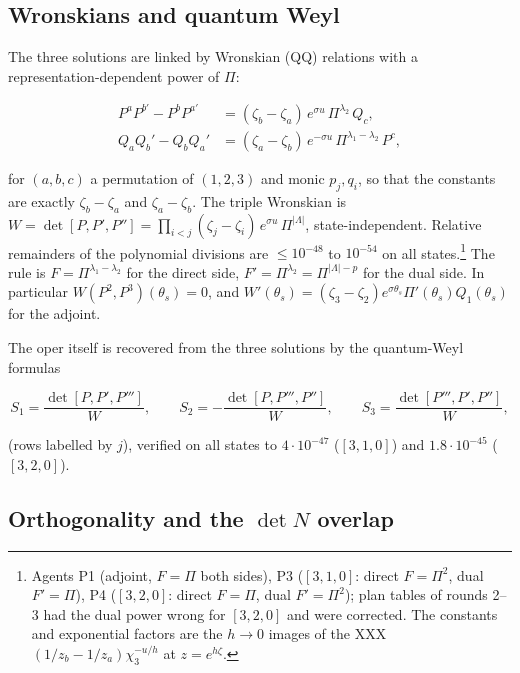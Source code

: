 \documentclass[11pt]{article}
\begin{document}
\subsection{Wronskians and quantum Weyl}\label{sec:wronsk}

The three solutions are linked by Wronskian (QQ) relations with a representation-dependent power of $\Pi$:

\begin{equation}
\begin{aligned}
P^aP^{b\prime}-P^bP^{a\prime}&=(\zeta_b-\zeta_a)\,e^{\sigma u}\,\Pi^{\lambda_2}\,Q_c,\\
Q_aQ_b'-Q_bQ_a'&=(\zeta_a-\zeta_b)\,e^{-\sigma u}\,\Pi^{\lambda_1-\lambda_2}\,P^c,
\end{aligned}\label{eq:QQ}
\end{equation}

for $(a,b,c)$ a permutation of $(1,2,3)$ and monic $p_j,q_i$, so that the constants are exactly $\zeta_b-\zeta_a$ and $\zeta_a-\zeta_b$. The triple Wronskian is $W=\det[P,P',P'']=\prod_{i<j}(\zeta_j-\zeta_i)\,e^{\sigma u}\,\Pi^{|\Lambda|}$, state-independent.
Relative remainders of the polynomial divisions are $\le10^{-48}$ to $10^{-54}$ on all states.\footnote{Agents P1 (adjoint, $F=\Pi$ both sides), P3 ($[3,1,0]$: direct $F=\Pi^2$, dual $F'=\Pi$), P4 ($[3,2,0]$: direct $F=\Pi$, dual $F'=\Pi^2$); plan tables of rounds 2--3 had the dual power wrong for $[3,2,0]$ and were corrected.
The constants and exponential factors are the $h\to0$ images of the XXX $(1/z_b-1/z_a)\chi_3^{-u/h}$ at $z=e^{h\zeta}$.} The rule is $F=\Pi^{\lambda_1-\lambda_2}$ for the direct side, $F'=\Pi^{\lambda_2}=\Pi^{|\Lambda|-p}$ for the dual side.
In particular $W(P^2,P^3)(\theta_s)=0$, and $W'(\theta_s)=(\zeta_3-\zeta_2)e^{\sigma\theta_s}\Pi'(\theta_s)Q_1(\theta_s)$ for the adjoint.

The oper itself is recovered from the three solutions by the quantum-Weyl formulas

\begin{equation}
S_1=\frac{\det[P,P',P''']}{W},\qquad S_2=-\frac{\det[P,P''',P'']}{W},\qquad S_3=\frac{\det[P''',P',P'']}{W},\label{eq:weyl}
\end{equation}

(rows labelled by $j$), verified on all states to $4\cdot10^{-47}$ ($[3,1,0]$) and $1.8\cdot10^{-45}$ ($[3,2,0]$).

\subsection{Orthogonality and the \texorpdfstring{$\det N$}{detN} overlap}\label{sec:detN}
\end{document}
